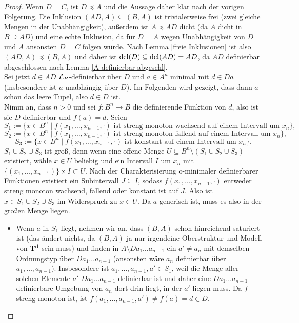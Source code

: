 \begin{proof}
	Wenn $D=C$, ist $D\preceq A$ und die Aussage daher klar nach der vorigen Folgerung. Die Inklusion $(AD,A)\subseteq(B,A)$ ist trivialerweise frei (zwei gleiche Mengen in der Unabhängigkeit), außerdem ist $A\preceq AD$ dicht (da $A$ dicht in $B\supseteq AD$) und eine echte Inklusion, da für $D=A$ wegen Unabhängigkeit von $D$ und $A$ ansonsten $D=C$ folgen würde. Nach Lemma \ref{freie Inklusionen} ist also $(AD,A)\preceq(B,A)$ und daher ist $\operatorname{dcl}(D)\subseteq\operatorname{dcl}(AD)=AD$, da $AD$ definierbar abgeschlossen nach Lemma \ref{A definierbar abgeschl}.\\
	Sei jetzt $d\in AD$ $\mathcal{L}_P$-definierbar über $D$ und $a\in A^n$ minimal mit $d\in Da$ (insbesondere ist $a$ unabhängig über $D$). Im Folgenden wird gezeigt, dass dann $a$ schon das leere Tupel, also $d\in D$ ist.\\
	Nimm an, dass $n>0$ und sei $f:B^n\rightarrow B$ die definierende Funktion von $d$, also ist sie $D$-definierbar und $f(a)=d$. Seien $$S_1:=\{x\in B^n\mid f(x_1,\dots,x_{n-1},\cdot)\text{ ist streng monoton wachsend auf einem Intervall um }x_n\},$$ $$S_2:=\{x\in B^n\mid f(x_1,\dots,x_{n-1},\cdot)\text{ ist streng monoton fallend auf einem Intervall um }x_n\},$$ $$S_3:=\{x\in B^n\mid f(x_1,\dots,x_{n-1},\cdot)\text{ ist konstant auf einem Intervall um }x_n\}.$$
	$S_1\cup S_2\cup S_3$ ist groß, denn wenn eine offene Menge $U\subseteq B^n\setminus(S_1\cup S_2\cup S_3)$ existiert, wähle $x\in U$ beliebig und ein Intervall $I$ um $x_n$ mit $\{(x_1,\dots,x_{n-1})\}\times I\subset U$. Nach der Charakterisierung o-minimaler definierbarer Funktionen existiert ein Subintervall $J\subseteq I$, sodass $f(x_1,\dots,x_{n-1},\cdot)$ entweder streng monoton wachsend, fallend oder konstant ist auf $J$. Also ist $x\in S_1\cup S_2\cup S_3$ im Widerspruch zu $x\in U$.\newpage
	Da $a$ generisch ist, muss es also in der großen Menge liegen.
	\begin{itemize}
		\item Wenn $a$ in $S_1$ liegt, nehmen wir an, dass $(B,A)$ schon hinreichend saturiert ist (das ändert nichts, da $(B,A)$ ja nur irgendeine Oberstruktur und Modell von $\operatorname{T^d}$ sein muss) und finden in $A\setminus Da_1\dots a_{n-1}$ ein $a'\neq a_n$ mit demselben Ordnungstyp über $Da_1\dots a_{n-1}$ (ansonsten wäre $a_n$ definierbar über $a_1,\dots,a_{n-1}$). Insbesondere ist $a_1,\dots,a_{n-1},a'\in S_1$, weil die Menge aller solchen Elemente $a'$ $Da_1\dots a_{n-1}$-definierbar ist und daher eine $Da_1\dots a_{n-1}$-definierbare Umgebung von $a_n$ dort drin liegt, in der $a'$ liegen muss. Da $f$ streng monoton ist, ist $f(a_1,\dots,a_{n-1},a')\neq f(a)=d\in D$.\\

\end{itemize}
\end{proof}
